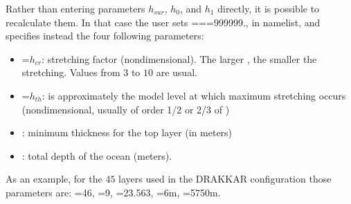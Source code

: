 {Rather than entering parameters $h_{sur}$, $h_{0}$, and $h_{1}$ directly, it is 
possible to recalculate them. In that case the user sets 
===999999., in  namelist, 
and specifies instead the four following parameters:
\begin{itemize}
\item 	{}=$h_{cr} $: stretching factor (nondimensional). The larger 
, the smaller the stretching. Values from $3$ to $10$ are usual.
\item 	{}=$h_{th} $: is approximately the model level at which maximum 
stretching occurs (nondimensional, usually of order 1/2 or 2/3 of )
\item 	{}: minimum thickness for the top layer (in meters)
\item 	{}: total depth of the ocean (meters).
\end{itemize}
As an example, for the $45$ layers used in the DRAKKAR configuration those 
parameters are: =46, =9, =23.563, =6m, 
=5750m.

}
